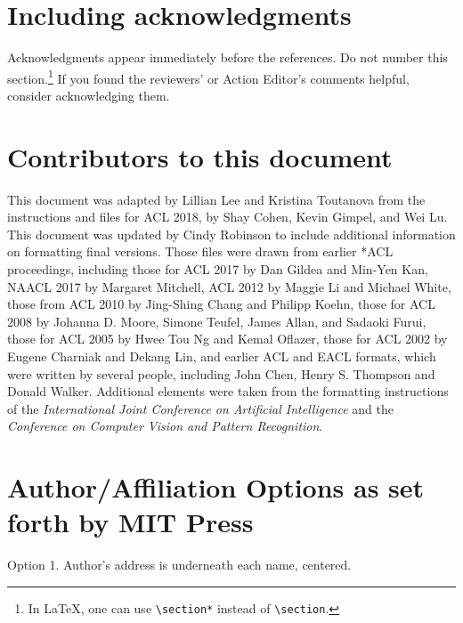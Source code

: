 \documentclass[11pt,a4paper]{article}
\begin{document}
\iftaclpubformat

\section{Including acknowledgments}
Acknowledgments appear immediately before the references.  Do not number this
section.\footnote{In \LaTeX, one can use {\tt {\textbackslash}section*} instead
of {\tt {\textbackslash}section}.} If you found the reviewers' or Action
Editor's comments helpful, consider acknowledging them.
\else
\fi

\section{Contributors to this document}
\label{sec:contributors}

This document was adapted by Lillian Lee and Kristina Toutanova
from the instructions and files for ACL 2018, by Shay Cohen, Kevin Gimpel, and
Wei Lu. 
This document was updated by Cindy Robinson to
include additional information on formatting final versions.
Those files were drawn from earlier *ACL proceedings, including those
for ACL 2017 by Dan Gildea and Min-Yen Kan, NAACL 2017 by Margaret Mitchell,
ACL 2012 by Maggie Li and Michael White, those from ACL 2010 by Jing-Shing
Chang and Philipp Koehn, those for ACL 2008 by Johanna D. Moore, Simone
Teufel, James Allan, and Sadaoki Furui, those for ACL 2005 by Hwee Tou Ng and
Kemal Oflazer, those for ACL 2002 by Eugene Charniak and Dekang Lin, and
earlier ACL and EACL formats,  which were written by several people,
including John Chen, Henry S. Thompson and Donald Walker. Additional elements
were taken from the formatting instructions of the {\em International Joint
Conference on Artificial   Intelligence} and the \emph{Conference on Computer
Vision and Pattern Recognition}.




\iftaclpubformat

\onecolumn

\appendix
\section{Author/Affiliation Options as set forth by MIT Press}
\label{sec:authorformatting}

Option 1. Author’s address is underneath each name, centered.
\end{document}
